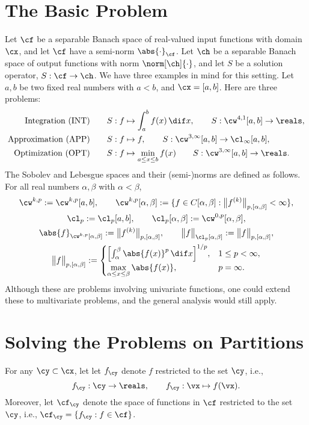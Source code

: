 \documentclass[final]{elsarticle}
\newcommand{\Fnorm}[1]{\abs{#1}_{\cf}}
\newcommand{\Hnorm}[1]{\norm[\ch]{#1}}
\theoremstyle{definition}
\theoremstyle{remark}
\begin{document}
\section{The Basic Problem}
Let $\cf$ be a separable Banach space of real-valued input functions with domain $\cx$, and let $\cf$ have a semi-norm $\Fnorm{\cdot}$.  Let $\ch$ be a separable Banach space of output functions with norm $\Hnorm{\cdot}$, and let $S$ be a solution operator, $S:\cf \to \ch$.  We have three examples in mind for this setting.  Let $a, b$ be two fixed real numbers with $a<b$, and $\cx=[a,b]$.  Here are three problems:
\begin{align*}
\text{Integration (INT)} \qquad &  S: f \mapsto \int_a^b f(x) \, \dif x, \qquad S:\cw^{4,1}[a,b] \to \reals, \\ 
\text{Approximation (APP)} \qquad &  S: f \mapsto f, \qquad S:\cw^{3,\infty}[a,b] \to \cl_{\infty}[a,b], \\ 
\text{Optimization (OPT)} \qquad & S: f \mapsto \min_{a \le x  \le b} f(x) \qquad S:\cw^{3,\infty}[a,b] \to \reals. 
\end{align*}
The Sobolev and Lebesgue spaces and their (semi-)norms are defined as follows.  For all real numbers $\alpha, \beta$ with $\alpha < \beta$,
\begin{gather*}
\cw^{k,p}:=\cw^{k,p}[a,b], \qquad \cw^{k,p}[\alpha,\beta]:=\{f\in C[\alpha,\beta]: \bigl \lVert f^{(k)} \bigr \rVert_{p,[\alpha,\beta]} <\infty\}, \\
\cl_p:=\cl_p[a,b], \qquad 
\cl_p[\alpha,\beta]:=\cw^{0,p}[\alpha,\beta],\\
\abs{f}_{\cw^{k,p}[\alpha,\beta]} :=  \bigl \lVert f^{(k)} \bigr \rVert_{p,[\alpha,\beta]}, \qquad 
\bigl \lVert f \bigr \rVert_{\cl_p[\alpha,\beta]} :=  \bigl \lVert f \bigr \rVert_{p,[\alpha,\beta]}, \\
\bigl \lVert f \bigr \rVert_{p,[\alpha,\beta]} := \begin{cases} \Bigl [ \int_\alpha^\beta \abs{f(x)}^p \, \dif x \Bigr ]^{1/p} , & 1 \le p < \infty, \\
\displaystyle \max_{\alpha \le x  \le \beta} \abs{f(x)}, & p=\infty. \end{cases}
\end{gather*} 
Although these are problems involving univariate functions, one could extend these to multivariate problems, and the general analysis would still apply.

\section{Solving the Problems on Partitions}
For any $\cy \subset \cx$, let let $f_{\cy}$ denote $f$ restricted to the set $\cy$, i.e., 
\begin{equation*}
f_{\cy}:\cy \to \reals, \qquad f_{\cy} :\vx \mapsto f(\vx).
\end{equation*}
Moreover, let $\cf_{\cy}$ denote the space of functions in $\cf$ restricted to the set $\cy$, i.e., $\cf_{\cy} = \{f_{\cy} : f \in \cf \}$.  
\end{document}
